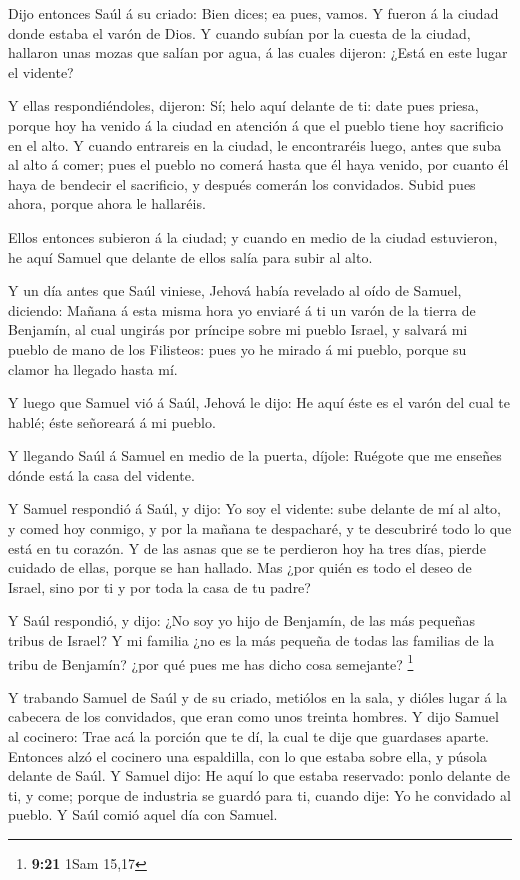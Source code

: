  Dijo entonces Saúl á su criado: Bien dices; ea pues,
vamos. Y fueron á la ciudad donde estaba el varón de Dios. 
Y cuando subían por la cuesta de la ciudad, hallaron unas mozas que
salían por agua, á las cuales dijeron: ¿Está en este lugar el vidente?

 Y ellas respondiéndoles, dijeron: Sí; helo aquí delante de
ti: date pues priesa, porque hoy ha venido á la ciudad en atención á que
el pueblo tiene hoy sacrificio en el alto.  Y cuando
entrareis en la ciudad, le encontraréis luego, antes que suba al alto á
comer; pues el pueblo no comerá hasta que él haya venido, por cuanto él
haya de bendecir el sacrificio, y después comerán los convidados. Subid
pues ahora, porque ahora le hallaréis.

 Ellos entonces subieron á la ciudad; y cuando en medio de
la ciudad estuvieron, he aquí Samuel que delante de ellos salía para
subir al alto.

 Y un día antes que Saúl viniese, Jehová había revelado al
oído de Samuel, diciendo:  Mañana á esta misma hora yo
enviaré á ti un varón de la tierra de Benjamín, al cual ungirás por
príncipe sobre mi pueblo Israel, y salvará mi pueblo de mano de los
Filisteos: pues yo he mirado á mi pueblo, porque su clamor ha llegado
hasta mí.

 Y luego que Samuel vió á Saúl, Jehová le dijo: He aquí
éste es el varón del cual te hablé; éste señoreará á mi pueblo.

 Y llegando Saúl á Samuel en medio de la puerta, díjole:
Ruégote que me enseñes dónde está la casa del vidente.

 Y Samuel respondió á Saúl, y dijo: Yo soy el vidente: sube
delante de mí al alto, y comed hoy conmigo, y por la mañana te
despacharé, y te descubriré todo lo que está en tu corazón.
 Y de las asnas que se te perdieron hoy ha tres días,
pierde cuidado de ellas, porque se han hallado. Mas ¿por quién es todo
el deseo de Israel, sino por ti y por toda la casa de tu padre?

 Y Saúl respondió, y dijo: ¿No soy yo hijo de Benjamín, de
las más pequeñas tribus de Israel? Y mi familia ¿no es la más pequeña de
todas las familias de la tribu de Benjamín? ¿por qué pues me has dicho
cosa semejante? \footnote{\textbf{9:21} 1Sam 15,17}

 Y trabando Samuel de Saúl y de su criado, metiólos en la
sala, y dióles lugar á la cabecera de los convidados, que eran como unos
treinta hombres.  Y dijo Samuel al cocinero: Trae acá la
porción que te dí, la cual te dije que guardases aparte. 
Entonces alzó el cocinero una espaldilla, con lo que estaba sobre ella,
y púsola delante de Saúl. Y Samuel dijo: He aquí lo que estaba
reservado: ponlo delante de ti, y come; porque de industria se guardó
para ti, cuando dije: Yo he convidado al pueblo. Y Saúl comió aquel día
con Samuel.

